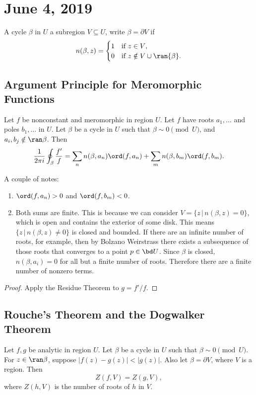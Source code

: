 \section{June 4, 2019}
\begin{definition}
    A cycle $\beta$ in $U$  a subregion $V \subseteq U$,
    write $\beta = \partial V$ if
    \[ n(\beta, z) = 
        \begin{cases} 1 & \text{if $z \in V$}, \\
            0 & \text{if $z \notin V \cup \ran{\beta}$}.
        \end{cases}
        \]
\end{definition}

\subsection{Argument Principle for Meromorphic Functions}
\begin{theorem}
    Let $f$ be nonconstant and meromorphic in region $U$.
    Let $f$ have roots $a_1, \ldots$ and poles $b_1, \ldots$ in $U$.
    Let $\beta$ be a cycle in $U$ such that $\beta \sim 0 \pmod{U}$,
    and $a_i, b_j \notin \ran \beta$.
    Then
    \[ \frac{1}{2\pi i} \oint_{\beta} \frac{f'}{f} = \sum_n n(\beta, a_n)
    \ord (f, a_n) + \sum_{m} n(\beta, b_m) \ord(f, b_m). \]
\end{theorem}
A couple of notes:
\begin{enumerate}
    \item $\ord(f, a_n) > 0$ and $\ord (f, b_m) < 0$.
    \item Both sums are finite.  This is because we can consider
        $V = \{z \, | \, n(\beta, z) = 0\}$, which is open and contains
        the exterior of some disk.
        This means $\{z \, | \, n(\beta, z) \ne 0\}$ is closed and bounded.
        If there are an infinite number of roots, for example, then
        by Bolzano Weirstrass there exists a subsequence of those roots
        that converges to a point $p \in \bd U$.
        Since $\beta$ is closed, $n(\beta, a_i) = 0$ for all
        but a finite number of roots.
        Therefore there are a finite number of nonzero terms.
\end{enumerate}

\begin{proof}
    Apply the Residue Theorem to $g = f'/f$.
\end{proof}

\subsection{Rouche's Theorem and the Dogwalker Theorem}
\begin{theorem}
    Let $f, g$ be analytic in region $U$.
    Let $\beta$ be a cycle in $U$ such that $\beta \sim 0 \pmod{U}$.
    For $z \in \ran \beta$, suppose $|f(z)-g(z)| < |g(z)|$.
    Also let $\beta = \partial V$, where $V$ is a region.
    Then
    \[ Z(f, V) = Z(g, V), \]
    where $Z(h, V)$ is the number of roots of $h$ in $V$.
\end{theorem}

